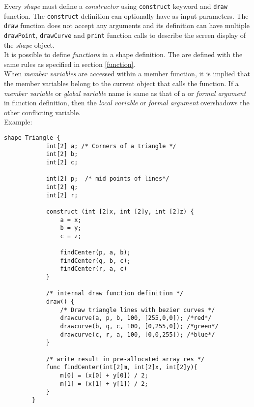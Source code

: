     Every \textit{shape} must define a \textit{constructor} using \texttt{construct} keyword and \texttt{draw} function. The \texttt{construct} definition can optionally have  as input parameters. The \texttt{draw} function does not accept any arguments and its definition can have multiple \texttt{drawPoint}, \texttt{drawCurve} and \texttt{print} function calls to describe the screen display of the \textit{shape} object.\\

    It is possible to define \textit{functions} in a shape definition. The  are defined with the same rules as specified in section \ref{function}.\\
    When \textit{member variables} are accessed within a member function, it is implied that the member variables belong to the current object that calls the function. If a \textit{member variable} or \textit{global variable} name is same as that of a  or \textit{formal argument} in function definition, then the \textit{local variable} or \textit{formal argument} overshadows the other conflicting variable.\\

    Example:\\
    \begin{lstlisting}[style=sol]
        shape Triangle {
            int[2] a; /* Corners of a triangle */
            int[2] b;
            int[2] c;

            int[2] p;  /* mid points of lines*/
            int[2] q;
            int[2] r;

            construct (int [2]x, int [2]y, int [2]z) {
                a = x;
                b = y;
                c = z;

                findCenter(p, a, b);
                findCenter(q, b, c);
                findCenter(r, a, c)
            }

            /* internal draw function definition */
            draw() {
                /* Draw triangle lines with bezier curves */
                drawcurve(a, p, b, 100, [255,0,0]); /*red*/
                drawcurve(b, q, c, 100, [0,255,0]); /*green*/
                drawcurve(c, r, a, 100, [0,0,255]); /*blue*/
            }

            /* write result in pre-allocated array res */
            func findCenter(int[2]m, int[2]x, int[2]y){
                m[0] = (x[0] + y[0]) / 2;
                m[1] = (x[1] + y[1]) / 2;
            }
        }
    \end{lstlisting}

